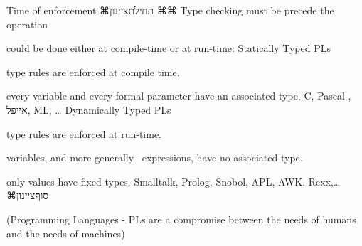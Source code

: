       Time of enforcement
      ⌘תחילת{ציינון}
        ⌘⌘ Type checking must be precede the operation
              \item could be done either at compile-time or at run-time:
              Statically Typed PLs
              \item type rules are enforced at compile time.
              \item every variable and every formal parameter have
              an associated type.
              C, Pascal , אייפל, ML, …
              Dynamically Typed PLs
              \item type rules are enforced at run-time.
              \item variables, and more generally– expressions,
              have no associated type.
              \item only values have fixed types.
              Smalltalk, Prolog, Snobol, APL, AWK, Rexx,…
      ⌘סוף{ציינון}

      (Programming Languages - PLs are a compromise
      between the needs of humans and the needs of machines)

